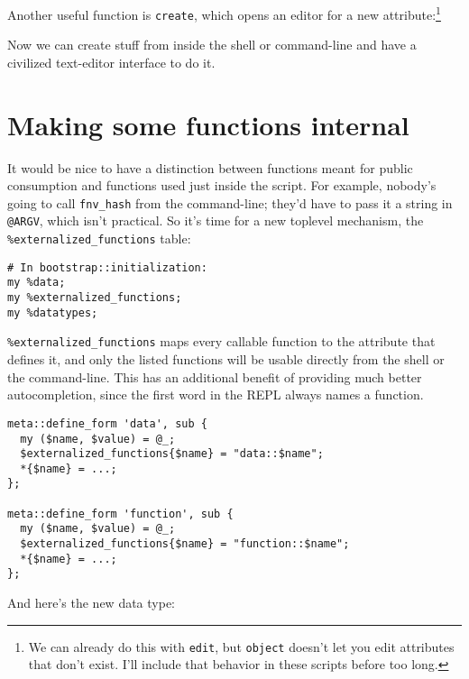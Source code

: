 \documentclass{report}
\begin{document}
    Another useful function is {\tt create}, which opens an editor for a new attribute:\footnote{We can already do this with {\tt edit}, but {\tt object} doesn't let you edit attributes that
    don't exist. I'll include that behavior in these scripts before too long.}


    Now we can create stuff from inside the shell or command-line and have a civilized text-editor interface to do it.

\section{Making some functions internal}\label{sec:some-improvements-making-some-functions-internal}
    It would be nice to have a distinction between functions meant for public consumption and functions used just inside the script. For example, nobody's going to call \verb|fnv_hash| from
    the command-line; they'd have to pass it a string in {\tt @ARGV}, which isn't practical. So it's time for a new toplevel mechanism, the \verb|%externalized_functions| table:

\begin{verbatim}
# In bootstrap::initialization:
my %data;
my %externalized_functions;
my %datatypes;
\end{verbatim}

    \verb|%externalized_functions| maps every callable function to the attribute that defines it, and only the listed functions will be usable directly from the shell or the command-line. This
    has an additional benefit of providing much better autocompletion, since the first word in the REPL always names a function.

\begin{verbatim}
meta::define_form 'data', sub {
  my ($name, $value) = @_;
  $externalized_functions{$name} = "data::$name";
  *{$name} = ...;
};

meta::define_form 'function', sub {
  my ($name, $value) = @_;
  $externalized_functions{$name} = "function::$name";
  *{$name} = ...;
};
\end{verbatim}

    \noindent And here's the new data type:
\end{document}
